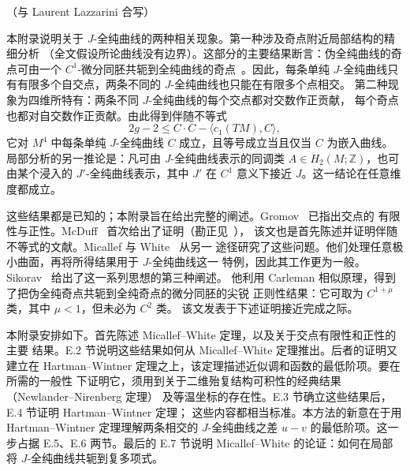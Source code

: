
\begin{center}
  （与 Laurent Lazzarini 合写）
\end{center}

本附录说明关于 $J$-全纯曲线的两种相关现象。第一种涉及奇点附近局部结构的精细分析
（全文假设所论曲线没有边界）。这部分的主要结果断言：伪全纯曲线的奇点可由一个
$C^1$-微分同胚共轭到全纯曲线的奇点~。因此，每条单纯
$J$-全纯曲线只有有限多个自交点，两条不同的 $J$-全纯曲线也只能在有限多个点相交。
第二种现象为四维所特有：两条不同 $J$-全纯曲线的每个交点都对交数作正贡献，
每个奇点也都对自交数作正贡献。由此得到伴随不等式
\[
  2g-2\le C\cdot C-\langle c_1(TM),C\rangle,
\]
它对 $M^4$ 中每条单纯 $J$-全纯曲线 $C$ 成立，且等号成立当且仅当 $C$ 为嵌入曲线。
局部分析的另一推论是：凡可由 $J$-全纯曲线表示的同调类
$A\in H_2(M;\mathbb Z)$，也可由某个浸入的 $J'$-全纯曲线表示，其中 $J'$ 在
$C^1$ 意义下接近 $J$。这一结论在任意维度都成立。

这些结果都是已知的；本附录旨在给出完整的阐述。Gromov~ 已指出交点的
有限性与正性。McDuff~ 首次给出了证明（勘正见~），
该文也是首先陈述并证明伴随不等式的文献。Micallef 与 White~ 从另一
途径研究了这些问题。他们处理任意极小曲面，再将所得结果用于 $J$-全纯曲线这一
特例，因此其工作更为一般。Sikorav~ 给出了这一系列思想的第三种阐述。
他利用 Carleman 相似原理，得到了把伪全纯奇点共轭到全纯奇点的微分同胚的尖锐
正则性结果：它可取为 $C^{1+\mu}$ 类，其中 $\mu<1$，但未必为 $C^2$ 类。
该文发表于下述证明接近完成之际。

本附录安排如下。首先陈述 Micallef--White 定理，以及关于交点有限性和正性的主要
结果。E.2 节说明这些结果如何从 Micallef--White 定理推出。后者的证明又建立在
Hartman--Wintner 定理之上，该定理描述近似调和函数的最低阶项。要在所需的一般性
下证明它，须用到关于二维殆复结构可积性的经典结果（Newlander--Nirenberg 定理）
及等温坐标的存在性。E.3 节确立这些结果后，E.4 节证明 Hartman--Wintner 定理；
这些内容都相当标准。本方法的新意在于用 Hartman--Wintner 定理理解两条相交的
$J$-全纯曲线之差 $u-v$ 的最低阶项。这一步占据 E.5、E.6 两节。最后的 E.7 节说明
Micallef--White 的论证：如何在局部将 $J$-全纯曲线共轭到复多项式。

